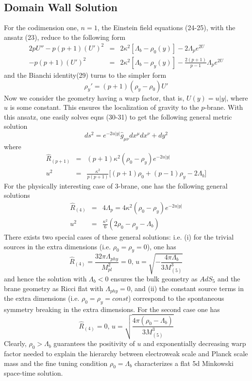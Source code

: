 \documentclass[a4paper,12pt]{article}
\begin{document}
\subsection{Domain Wall Solution}
   For the codimension one, $n=1$, the Einstein field equations (24-25), with 
the ansatz (23), reduce to the following form
\begin{eqnarray}
2pU''-p(p+1)(U')^2&=&2\kappa^2[\Lambda_b-\rho_0(y)]-2\Lambda_p e^{2U}\\
-p(p+1)(U')^2&=& 2\kappa^2[\Lambda_b-\rho_y(y)]-
\frac{2(p+1)}{p-1}\Lambda_p e^{2U}
\end{eqnarray}
and the Bianchi identity(29) turns to the simpler form
\begin{equation}
\rho_y'=(p+1)(\rho_y-\rho_0)U'
\end{equation}
Now we consider the geometry having a warp factor, that is,
$U(y)=u|y|$, where $u$ is some constant. This ensures the localization of 
gravity to the $p$-brane.  With this ansatz, one easily solves 
eqns (30-31) to get the following general metric solution \cite{RS1, ODA}
\begin{equation}
ds^2=e^{-2u|y|}\hat g_{\mu\nu}dx^{\mu}dx^{\nu}+dy^2
\end{equation}
where
\begin{eqnarray}
\hat R_{(p+1)}&=&(p+1)\kappa^2 (\rho_0-\rho_y) e^{-2u|y|}\\
u^2&=&\frac{\kappa^2}{p(p+1)}\big[(p+1)\rho_0+(p-1)\rho_y-2\Lambda_b\big]
\end{eqnarray}
For the physically interesting case of $3$-brane, one has the
following general solutions
\begin{eqnarray}
\hat R_{(4)}&=&4\Lambda_p=4\kappa^2(\rho_0-\rho_y) e^{-2u|y|}\\
u^2&=&\frac{\kappa^2}{6}(2\rho_0-\rho_y-\Lambda_b)
\end{eqnarray}
There exists two special cases of these general solutions: i.e.
(i) for the trivial sources in the extra dimensions (i.e. $\rho_0=\rho_y=0$),
one has
\begin{equation}
\hat R_{(4)}=\frac{32\pi\Lambda_{phy}}{M_{pl}^2}=0,\,
u=\sqrt{-\frac{4\pi \Lambda_b}{3 M_{(5)}^3}}
\end{equation}
and hence the solution with $\Lambda_b<0$ ensures the bulk geometry as 
$AdS_5$ and the brane geometry as Ricci flat with $\Lambda_{phy}=0$, 
and (ii) the constant source terms in the extra dimensions 
(i.e. $\rho_0=\rho_y=const$) correspond to the spontaneous symmetry 
breaking in the extra dimensions. For the second case one has
\begin{equation}
\hat R_{(4)}=0, \, u=\sqrt{\frac{4\pi(\rho_0-\Lambda_b)}{3 M_{(5)}^3}}
\end{equation}
Clearly, $\rho_0>\Lambda_b$ guarantees the positivity of $u$ and 
exponentially decreasing warp factor needed to explain the hierarchy 
between electroweak scale and Planck scale mass \cite{NAH,RS1} and the fine 
tuning condition $\rho_0=\Lambda_b$ characterizes a flat 5d Minkowski 
space-time solution.
\end{document}
